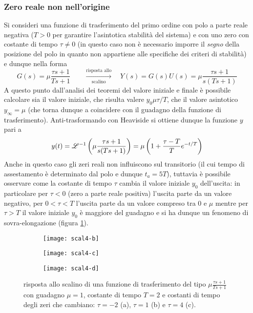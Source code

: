 		\subsubsection{Zero reale non nell'origine}
			Si consideri una funzione di trasferimento del primo ordine con polo a parte reale negativa ($T>0$ per garantire l'asintotica stabilità del sistema) e con uno zero con costante di tempo $\tau \neq 0$ (in questo caso non è necessario imporre il \textit{segno} della posizione del polo in quanto non appartiene alle specifiche dei criteri di stabilità) e dunque nella forma
			\[ G(s) = \mu \frac{\tau s + 1}{Ts+1}  \qquad \xrightarrow[\textrm{scalino}]{\textrm{risposta allo}} \quad Y(s) = G(s) U(s) = \mu \frac{\tau s + 1}{s(Ts+1)}\]
			A questo punto dall'analisi dei teoremi del valore iniziale e finale è possibile calcolare sia il valore iniziale, che risulta valere $y_0  \mu \tau/T$, che il valore asintotico $y_\infty =\mu$ (che torna dunque a coincidere con il guadagno della funzione di trasferimento). Anti-trasformando con Heaviside si ottiene dunque la funzione $y$  pari a 
			\[y(t) = \mathscr {L}^{-1} \left( \mu \frac{\tau s + 1}{s(Ts+1)} \right) = \mu \left(1 + \frac{\tau - T}T e^{-t/T}\right)  \]
			Anche in questo caso gli zeri reali non influiscono sul transitorio (il cui tempo di assestamento è determinato dal polo e dunque $t_a = 5T$), tuttavia è possibile osservare come la costante di tempo $\tau$ cambia il valore iniziale $y_0$ dell'uscita: in particolare per $\tau <0$ (zero a parte reale positiva) l'uscita parte da un valore negativo, per $0<\tau<T$ l'uscita parte da un valore compreso tra 0 e $\mu$ mentre per $\tau > T$ il valore iniziale $y_0$ è maggiore del guadagno e si ha dunque un fenomeno di sovra-elongazione (figura \ref{fig:lti:sist1zero}).
			
			\begin{figure}[bht]
				\centering
				\begin{subfigure}{0.325\linewidth}
					\centering
					\texttt{[image: scal4-b]} \caption{}
				\end{subfigure}
				\begin{subfigure}{0.325\linewidth}
					\centering
					\texttt{[image: scal4-c]} \caption{}
				\end{subfigure}
				\begin{subfigure}{0.325\linewidth}
					\centering
					\texttt{[image: scal4-d]} \caption{}
				\end{subfigure}
				\caption{risposta allo scalino di una funzione di trasferimento del tipo $\mu \frac{\tau s + 1}{Ts+1}$ con guadagno $\mu = 1$, costante di tempo $T=2$ e costanti di tempo degli zeri che cambiano: $\tau = -2$ (a), $\tau = 1$ (b) e $\tau = 4$ (c).} 
				\label{fig:lti:sist1zero}
			\end{figure}
		
